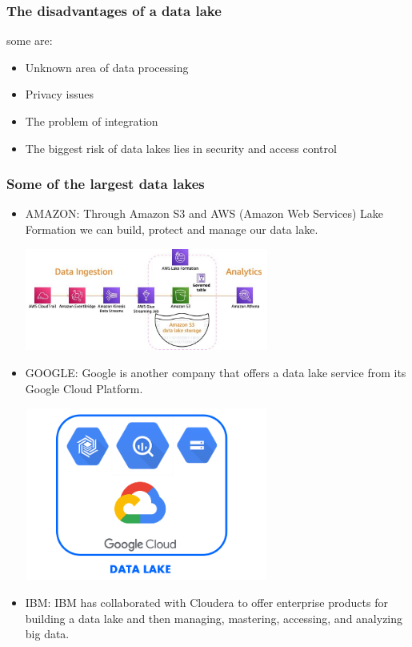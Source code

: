 \documentclass{article}
\begin{document}
\begin{multicols}{2}
\subsubsection {The disadvantages of a data lake}
some are:
\begin{itemize}
\item Unknown area of data processing
\item Privacy issues
\item The problem of integration
\item The biggest risk of data lakes lies in security and access control
\end{itemize}

\subsubsection {Some of the largest data lakes}
\begin{itemize}
\item AMAZON: Through Amazon S3 and AWS (Amazon Web Services) Lake Formation we can build, protect and manage our data lake.
\begin{center}
	\includegraphics[width=8cm]{./images/AMAZON.jpg} 
\end{center}
\item GOOGLE: Google is another company that offers a data lake service from its Google Cloud Platform.
\begin{center}
	\includegraphics[width=8cm]{./images/google.png} 
\end{center}
\item IBM: IBM has collaborated with Cloudera to offer enterprise products for building a data lake and then managing, mastering, accessing, and analyzing big data.

\end{itemize}
\end{multicols}
\end{document}
